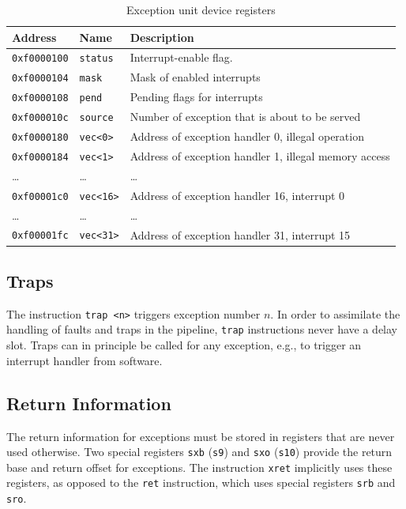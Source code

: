 \documentclass[a4paper,fontsize=10pt,twoside,DIV15,BCOR12mm,headinclude=true,footinclude=false,pagesize,bibtotoc]{scrbook}
\begin{document}
\begin{table}[b]
  \centering
  \begin{tabular}{llp{}}
    \toprule
    Address             & Name             & Description \\
    \midrule
    \texttt{0xf0000100} & \texttt{status} & Interrupt-enable flag. \\
    \texttt{0xf0000104} & \texttt{mask} & Mask of enabled interrupts \\
    \texttt{0xf0000108} & \texttt{pend} & Pending flags for interrupts \\
    \texttt{0xf000010c} & \texttt{source} & Number of exception that
    is about to be served \\
    \cmidrule{1-3}
    \texttt{0xf0000180} & \texttt{vec<0>} & Address of exception handler 0, illegal operation \\
    \texttt{0xf0000184} & \texttt{vec<1>} & Address of exception handler 1, illegal memory access \\
    \ldots & \ldots & \ldots \\
    \cmidrule{1-3}
    \texttt{0xf00001c0} & \texttt{vec<16>} & Address of exception handler 16, interrupt 0 \\
    \ldots & \ldots & \ldots \\
    \texttt{0xf00001fc} & \texttt{vec<31>} & Address of exception handler 31, interrupt 15 \\
    \bottomrule
  \end{tabular}
  \caption{Exception unit device registers}
  \label{tab:excioregs}
\end{table}

\subsection{Traps}

The instruction \texttt{trap <n>} triggers exception number $n$. In
order to assimilate the handling of faults and traps in the pipeline,
\texttt{trap} instructions never have a delay slot. Traps can in
principle be called for any exception, e.g., to trigger an interrupt
handler from software.

\subsection{Return Information}

The return information for exceptions must be stored in registers that
are never used otherwise. Two special registers \texttt{sxb}
(\texttt{s9}) and \texttt{sxo} (\texttt{s10}) provide the return base
and return offset for exceptions. The instruction \texttt{xret}
implicitly uses these registers, as opposed to the \texttt{ret}
instruction, which uses special registers \texttt{srb} and
\texttt{sro}.
\end{document}

